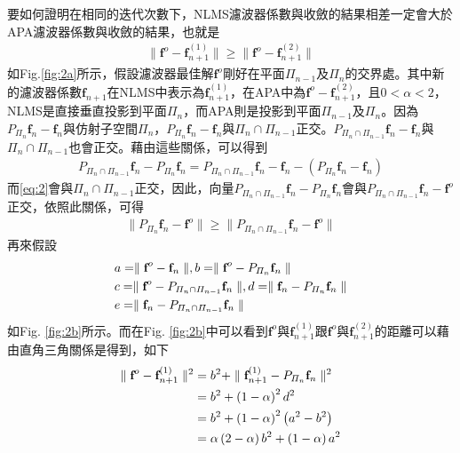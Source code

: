 \documentclass[conference]{IEEEtran}
\begin{document}
    要如何證明在相同的迭代次數下，NLMS濾波器係數與收斂的結果相差一定會大於APA濾波器係數與收斂的結果，也就是
    \begin{align}\label{eq:1}
        \parallel \textbf{f}^o-\textbf{f}^{\left( 1 \right)}_{n+1} \parallel \geq \parallel \textbf{f}^o-\textbf{f}^{\left( 2 \right)}_{n+1} \parallel 
    \end{align}
    如Fig.\ref{fig:2a}所示，假設濾波器最佳解$\textbf{f}^o$剛好在平面$\Pi_{n-1}$及$\Pi_{n}$的交界處。其中新的濾波器係數$\textbf{f}_{n+1}$在NLMS中表示為$\textbf{f}^{\left( 1 \right)}_{n+1}$，在APA中為$\textbf{f}^o-\textbf{f}^{\left( 2 \right)}_{n+1}$，且$0<\alpha<2$，NLMS是直接垂直投影到平面$\Pi_{n}$，而APA則是投影到平面$\Pi_{n-1}$及$\Pi_{n}$。因為$P_{\Pi_{n}}\textbf{f}_n-\textbf{f}_n$與仿射子空間$\Pi_{n}$，$P_{\Pi_{n}}\textbf{f}_n-\textbf{f}_n$與$\Pi_{n} \cap \Pi_{n-1}$正交。$P_{\Pi_{n} \cap \Pi_{n-1}}\textbf{f}_n-\textbf{f}_n$與$\Pi_{n} \cap \Pi_{n-1}$也會正交。藉由這些關係，可以得到
    \begin{align}\label{eq:2}
        P_{\Pi_{n} \cap \Pi_{n-1}}\textbf{f}_n-P_{\Pi_{n}}\textbf{f}_n=P_{\Pi_{n} \cap \Pi_{n-1}}\textbf{f}_n-\textbf{f}_n-\left( P_{\Pi_{n}}\textbf{f}_n-\textbf{f}_n \right)
    \end{align}
    而\eqref{eq:2}會與$\Pi_{n} \cap \Pi_{n-1}$正交，因此，向量$P_{\Pi_{n} \cap \Pi_{n-1}}\textbf{f}_n-P_{\Pi_{n}}\textbf{f}_n$會與$P_{\Pi_{n} \cap \Pi_{n-1}}\textbf{f}_n-\textbf{f}^o$正交，依照此關係，可得
    \begin{align}\label{eq:3}
        \parallel P_{\Pi_n}\textbf{f}_n-\textbf{f}^o \parallel  \geq \parallel P_{\Pi_n \cap \Pi_{n-1}}\textbf{f}_n-\textbf{f}^o \parallel
    \end{align}
    再來假設
    \begin{align}\label{eq:4}
        &a=\parallel \textbf{f}^o-\textbf{f}_n \parallel,  b=\parallel \textbf{f}^o-P_{\Pi_{n}}\textbf{f}_n\parallel \notag \\
        &c=\parallel \textbf{f}^o-P_{\Pi_n \cap \Pi_{n-1}}\textbf{f}_n \parallel, d=\parallel \textbf{f}_n-P_{\Pi_{n}}\textbf{f}_n\parallel \notag \\
        &e=\parallel \textbf{f}_n-P_{\Pi_n \cap \Pi_{n-1}}\textbf{f}_n \parallel
    \end{align}
    如Fig. \ref{fig:2b}所示。而在Fig. \ref{fig:2b}中可以看到$\textbf{f}^o$與$\textbf{f}^{\left( 1 \right)}_{n+1}$跟$\textbf{f}^o$與$\textbf{f}^{\left( 2 \right)}_{n+1}$的距離可以藉由直角三角關係是得到，如下
    \begin{align}\label{eq:5}
        \parallel \textbf{f}^o-\textbf{f}^{\left( 1 \right)}_{n+1} \parallel^2&=b^2+\parallel \textbf{f}^{\left( 1 \right)}_{n+1}-P_{\Pi_{n}}\textbf{f}_n\parallel^2 \notag \\
        &=b^2+\left( 1-\alpha \right)^2d^2 \notag \\
        &=b^2+\left( 1-\alpha \right)^2\left( a^2-b^2 \right) \notag \\
        &=\alpha \left( 2-\alpha \right)b^2+\left( 1-\alpha \right)a^2
    \end{align}
\end{document}
